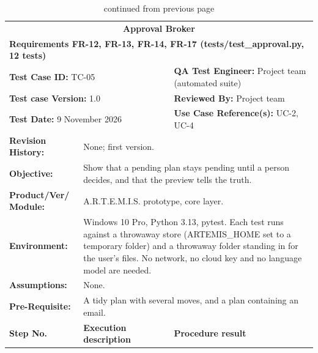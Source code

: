 \documentclass{FastFyp}
\begin{document}
{\small
{}
\begin{longtable}{|p{2.4cm}p{5.0cm}p{2.4cm}p{3.8cm}|}
\caption{Test case TC-05: approval broker.}\label{tab:tc5}\\*
\endfirsthead
\caption[]{continued from previous page}\\*
\endhead
\hline
\multicolumn{4}{|c|}{\textbf{Approval Broker}} \\* \hline
\multicolumn{4}{|p{14.8cm}|}{\textbf{Requirements FR-12, FR-13, FR-14, FR-17 (tests/test\_approval.py, 12 tests)}} \\* \hline
\multicolumn{2}{|p{7.8cm}|}{\textbf{Test Case ID:} TC-05} &
  \multicolumn{2}{p{6.6cm}|}{\textbf{QA Test Engineer:} Project team (automated suite)} \\* \hline
\multicolumn{2}{|p{7.8cm}|}{\textbf{Test case Version:} 1.0} &
  \multicolumn{2}{p{6.6cm}|}{\textbf{Reviewed By:} Project team} \\* \hline
\multicolumn{2}{|p{7.8cm}|}{\textbf{Test Date:} 9 November 2026} &
  \multicolumn{2}{p{6.6cm}|}{\textbf{Use Case Reference(s):} UC-2, UC-4} \\ \hline
\multicolumn{1}{|p{2.4cm}|}{\textbf{Revision History:}} &
  \multicolumn{3}{p{12.0cm}|}{None; first version.} \\ \hline
\multicolumn{1}{|p{2.4cm}|}{\textbf{Objective:}} &
  \multicolumn{3}{p{12.0cm}|}{Show that a pending plan stays pending until a person decides, and that the preview tells the truth.} \\ \hline
\multicolumn{1}{|p{2.4cm}|}{\textbf{Product/Ver/ Module:}} &
  \multicolumn{3}{p{12.0cm}|}{A.R.T.E.M.I.S. prototype, core layer.} \\ \hline
\multicolumn{1}{|p{2.4cm}|}{\textbf{Environment:}} &
  \multicolumn{3}{p{12.0cm}|}{Windows 10 Pro, Python 3.13, pytest. Each test runs against a throwaway store (ARTEMIS\_HOME set to a temporary folder) and a throwaway folder standing in for the user's files. No network, no cloud key and no language model are needed.} \\ \hline
\multicolumn{1}{|p{2.4cm}|}{\textbf{Assumptions:}} &
  \multicolumn{3}{p{12.0cm}|}{None.} \\ \hline
\multicolumn{1}{|p{2.4cm}|}{\textbf{Pre-Requisite:}} &
  \multicolumn{3}{p{12.0cm}|}{A tidy plan with several moves, and a plan containing an email.} \\ \hline
\multicolumn{1}{|p{2.4cm}|}{\textbf{Step No.}} &
  \multicolumn{1}{p{5.0cm}|}{\textbf{Execution description}} &
  \multicolumn{2}{p{6.6cm}|}{\textbf{Procedure result}} \\ \hline

\end{longtable}}
\end{document}

